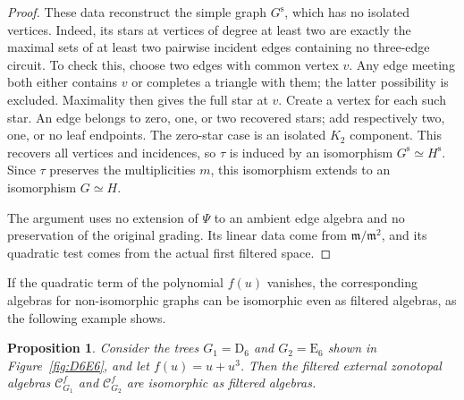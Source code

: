 \documentclass[reqno]{article}
\theoremstyle{plain} %
\newtheorem{proposition}[theorem]{Proposition}
\theoremstyle{definition}
\theoremstyle{remark}
\newcommand {\CC}{\mathscr{C}}
\numberwithin{equation}{section}
\begin{document}
\begin{proof}
These data reconstruct the simple graph $G^{\mathrm s}$, which has no
isolated vertices.
Indeed, its stars at vertices of degree at least two are exactly the
maximal sets of at least two pairwise incident edges containing no
three-edge circuit. To check this, choose two edges with common
vertex $v$. Any edge meeting both either contains $v$ or completes
a triangle with them; the latter possibility is excluded.
Maximality then gives the full star at $v$. Create a vertex for each
such star. An edge belongs to zero, one, or two recovered stars; add
respectively two, one, or no leaf endpoints. The zero-star case is
an isolated $K_2$ component. This recovers all vertices and incidences,
so $\tau$ is induced by an isomorphism $G^{\mathrm s}\simeq H^{\mathrm s}$.
Since $\tau$ preserves the multiplicities $m$, this isomorphism extends
to an isomorphism $G\simeq H$.

The argument uses no extension of $\Psi$ to an ambient edge algebra
and no preservation of the original grading. Its linear data come
from $\mathfrak m/\mathfrak m^2$, and its quadratic test comes from
the actual first filtered space.
\end{proof}


\medskip

If the quadratic term of the polynomial $f(u)$ vanishes, the corresponding algebras for non-isomorphic graphs  can be isomorphic even as filtered algebras, as the following example shows.

\begin{proposition}
  \label{prop:D6E6}
Consider the trees $G_1=\mathrm D_6$ and $G_2=\mathrm E_6$ shown in Figure~\ref{fig:D6E6}, and let $f(u)=u+u^3$.
Then the filtered external zonotopal algebras $\CC^f_{G_1}$ and $\CC^f_{G_2}$ are isomorphic as filtered algebras.
\end{proposition}
\end{document}
